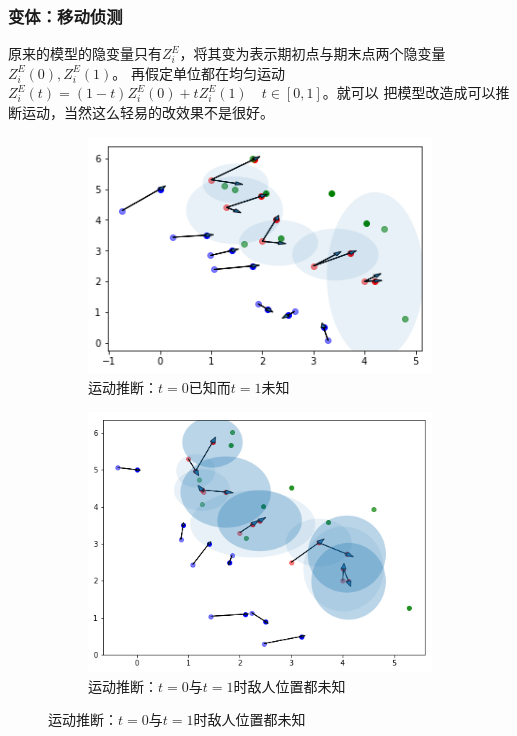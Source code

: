 \documentclass{beamer}
\begin{document}
\begin{frame}

\frametitle{变体：移动侦测}

原来的模型的隐变量只有$Z^E_i$，将其变为表示期初点与期末点两个隐变量$Z^E_i(0),Z^E_i(1)$。
再假定单位都在均匀运动$Z^E_i(t) =(1-t) Z^E_i(0) + t Z^E_i(1) \quad t \in [0,1]$。就可以
把模型改造成可以推断运动，当然这么轻易的改效果不是很好。

\begin{figure}[htb]
  \begin{subfigure}[b]{0.49\linewidth}
    \includegraphics[width=0.6\linewidth]{bkeu.png}
    \caption{运动推断：$t=0$已知而$t=1$未知}
  \end{subfigure}
  \begin{subfigure}[b]{0.49\linewidth}
    \includegraphics[width=0.6\linewidth]{bueu.png}
    \caption{运动推断：$t=0$与$t=1$时敌人位置都未知}
  \end{subfigure}
\end{figure}


\end{frame}
\end{document}
